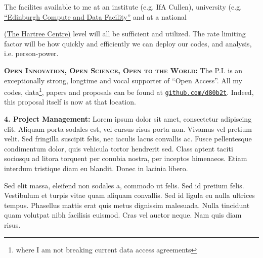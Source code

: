\documentclass[oneside, a4paper, onecolumn, 11pt]{article}
\begin{document}
\smallskip
\smallskip
\noindent
The facilites available to me at an institute (e.g. IfA Cullen),
university
(e.g. \href{https://www.ed.ac.uk/information-services/research-support/research-computing/ecdf}{``Edinburgh
Compute and Data Facility''} and at a national
{\href{https://www.hartree.stfc.ac.uk/Pages/home.aspx}{(The Hartree
Centre)} level will all be sufficient and utilized.  The rate limiting
factor will be how quickly and efficiently we can deploy our codes,
and analysis, i.e. person-power.

\textbf{\textsc{Open Innovation, Open Science, Open to the World:}} 
The P.I. is an exceptionally strong, longtime and vocal supporter of ``Open Access''. 
All my codes, data\footnote{where I am not breaking current data access agreements}, papers 
and proposals can be found at \href{github.com/d80b2t}{{\tt github.com/d80b2t}}. 
Indeed, this proposal itself is now at that location. 

\smallskip
\smallskip
\noindent
{\bf{\textcolor{Cerulean}{4. Project Management:}}}
Lorem ipsum dolor sit amet, consectetur adipiscing elit. Aliquam porta
sodales est, vel cursus risus porta non. Vivamus vel pretium
velit. Sed fringilla suscipit felis, nec iaculis lacus convallis
ac. Fusce pellentesque condimentum dolor, quis vehicula tortor
hendrerit sed. Class aptent taciti sociosqu ad litora torquent per
conubia nostra, per inceptos himenaeos. Etiam interdum tristique diam
eu blandit. Donec in lacinia libero.

Sed elit massa, eleifend non sodales a, commodo ut felis. Sed id
pretium felis. Vestibulum et turpis vitae quam aliquam convallis. Sed
id ligula eu nulla ultrices tempus. Phasellus mattis erat quis metus
dignissim malesuada. Nulla tincidunt quam volutpat nibh facilisis
euismod. Cras vel auctor neque. Nam quis diam risus.


}
\end{document}
